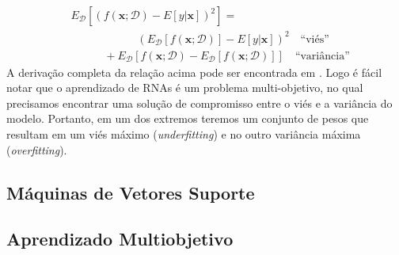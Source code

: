 \documentclass[conference]{IEEEtran}
\begin{document}
	 \begin{equation}
	 	\begin{aligned}
	 		& E_{\mathcal{D}}[(f(\mathbf{x};\mathcal{D}) - E[y|\mathbf{x}])^2] = \\ 
	 		& \qquad \qquad \qquad (E_{\mathcal{D}}[f(\mathbf{x}; \mathcal{D})] - E[y|\mathbf{x}])^2 \quad \text{``viés''} \\
	 		& \qquad \quad  + E_{\mathcal{D}}\left[ f(\mathbf{x};\mathcal{D}) - E_{\mathcal{D}}[f(\mathbf{x};\mathcal{D})]\right]   \quad \text{``variância''}
	 	\end{aligned}
	 \end{equation}
	 A derivação completa da relação acima pode ser encontrada em \cite{geman1992neural}. Logo é fácil notar que o aprendizado de RNAs é um problema multi-objetivo, no qual precisamos encontrar uma solução de compromisso entre o viés e a variância do modelo. Portanto, em um dos extremos teremos um conjunto de pesos que resultam em um viés máximo (\textit{underfitting}) e no outro variância máxima (\textit{overfitting}).
	 
	\subsection{Máquinas de Vetores Suporte}
	\subsection{Aprendizado Multiobjetivo}


	
    
	
	
\end{document}
